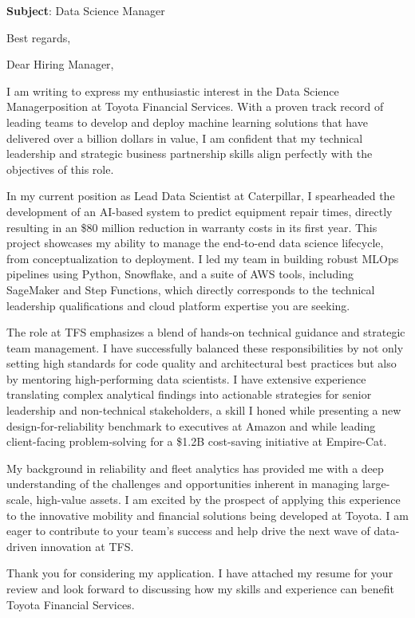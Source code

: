 \documentclass[11pt,a4paper,roman]{moderncv}
\newcommand{\companyname}{Toyota Financial Services}
\newcommand{\jobtitle}{Data Science Manager}
\begin{document}
\date{\today}
\opening{\textbf{Subject}: Data Science Manager}
\closing{Best regards,}
\makelettertitle

\vspace{0.5cm}


Dear Hiring Manager,

I am writing to express my enthusiastic interest in the \jobtitle position at \companyname. With a proven track record of leading teams to develop and deploy machine learning solutions that have delivered over a billion dollars in value, I am confident that my technical leadership and strategic business partnership skills align perfectly with the objectives of this role.

In my current position as Lead Data Scientist at Caterpillar, I spearheaded the development of an AI-based system to predict equipment repair times, directly resulting in an \$80 million reduction in warranty costs in its first year. This project showcases my ability to manage the end-to-end data science lifecycle, from conceptualization to deployment. I led my team in building robust MLOps pipelines using Python, Snowflake, and a suite of AWS tools, including SageMaker and Step Functions, which directly corresponds to the technical leadership qualifications and cloud platform expertise you are seeking.

The role at TFS emphasizes a blend of hands-on technical guidance and strategic team management. I have successfully balanced these responsibilities by not only setting high standards for code quality and architectural best practices but also by mentoring high-performing data scientists. I have extensive experience translating complex analytical findings into actionable strategies for senior leadership and non-technical stakeholders, a skill I honed while presenting a new design-for-reliability benchmark to executives at Amazon and while leading client-facing problem-solving for a \$1.2B cost-saving initiative at Empire-Cat.

My background in reliability and fleet analytics has provided me with a deep understanding of the challenges and opportunities inherent in managing large-scale, high-value assets. I am excited by the prospect of applying this experience to the innovative mobility and financial solutions being developed at Toyota. I am eager to contribute to your team's success and help drive the next wave of data-driven innovation at TFS.

Thank you for considering my application. I have attached my resume for your review and look forward to discussing how my skills and experience can benefit Toyota Financial Services.

 
\makeletterclosing
\end{document}
